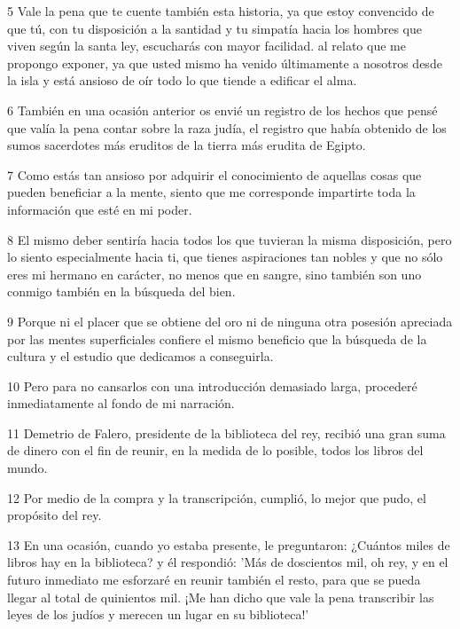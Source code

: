 \par 5 Vale la pena que te cuente también esta historia, ya que estoy convencido de que tú, con tu disposición a la santidad y tu simpatía hacia los hombres que viven según la santa ley, escucharás con mayor facilidad. al relato que me propongo exponer, ya que usted mismo ha venido últimamente a nosotros desde la isla y está ansioso de oír todo lo que tiende a edificar el alma.

\par 6 También en una ocasión anterior os envié un registro de los hechos que pensé que valía la pena contar sobre la raza judía, el registro que había obtenido de los sumos sacerdotes más eruditos de la tierra más erudita de Egipto.

\par 7 Como estás tan ansioso por adquirir el conocimiento de aquellas cosas que pueden beneficiar a la mente, siento que me corresponde impartirte toda la información que esté en mi poder.

\par 8 El mismo deber sentiría hacia todos los que tuvieran la misma disposición, pero lo siento especialmente hacia ti, que tienes aspiraciones tan nobles y que no sólo eres mi hermano en carácter, no menos que en sangre, sino también son uno conmigo también en la búsqueda del bien.

\par 9 Porque ni el placer que se obtiene del oro ni de ninguna otra posesión apreciada por las mentes superficiales confiere el mismo beneficio que la búsqueda de la cultura y el estudio que dedicamos a conseguirla.

\par 10 Pero para no cansarlos con una introducción demasiado larga, procederé inmediatamente al fondo de mi narración.

\par 11 Demetrio de Falero, presidente de la biblioteca del rey, recibió una gran suma de dinero con el fin de reunir, en la medida de lo posible, todos los libros del mundo.

\par 12 Por medio de la compra y la transcripción, cumplió, lo mejor que pudo, el propósito del rey.

\par 13 En una ocasión, cuando yo estaba presente, le preguntaron: ¿Cuántos miles de libros hay en la biblioteca? y él respondió: 'Más de doscientos mil, oh rey, y en el futuro inmediato me esforzaré en reunir también el resto, para que se pueda llegar al total de quinientos mil. ¡Me han dicho que vale la pena transcribir las leyes de los judíos y merecen un lugar en su biblioteca!'


